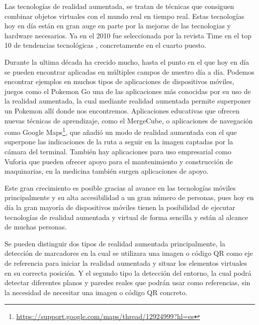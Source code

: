 
Las tecnologías de realidad aumentada, se tratan de técnicas que consiguen combinar objetos virtuales con el mundo real en tiempo real. 
Estas tecnologías hoy en día están en gran auge en parte por la mejoras de las tecnologias y hardware necesarios. Ya en el 2010 fue seleccionada por la revista Time en el top 10 de tendencias tecnológicas , concretamente en el cuarto puesto\cite{fletcher_2010}. 

Durante la ultima década ha crecido mucho, hasta el punto en el que hoy en día se pueden encontrar aplicadas en múltiples campos de nuestro día a día. Podemos encontrar ejemplos en muchos tipos de aplicaciones de dispositivos móviles, juegos como el Pokemon Go una de las aplicaciones más conocidas por su uso de la realidad aumentada, la cual mediante realidad aumentada permite superponer un Pokemon allí donde nos encontremos. Aplicaciones educativas que ofrecen nuevas técnicas de aprendizaje, como el MergeCube, o aplicaciones de navegación como Google Maps\footnote{\url{https://support.google.com/maps/thread/12924999?hl=es}}, que añadió un modo de realidad aumentada con el que superpone las indicaciones de la ruta a seguir en la imagen captadas por la cámara del terminal. También hay aplicaciones para uso empresarial como Vuforia que pueden ofrecer apoyo para el mantenimiento y construcción de maquinarias, en la medicina también surgen aplicaciones de apoyo.


Este gran crecimiento es posible gracias al avance en las tecnologías móviles principalmente y su alta accesibilidad a un gran número de personas, pues hoy en día la gran mayoría de dispositivos móviles tienen la posibilidad de ejecutar tecnologías de realidad aumentada y virtual de forma sencilla y están al alcance de muchas personas.

Se pueden distinguir dos tipos de realidad aumentada principalmente, la detección de marcadores en la cual se utilizara una imagen o código QR como eje de referencia para iniciar la realidad aumentada y situar los elementos virtuales en su correcta posición. 
Y el segundo tipo la detección del entorno, la cual podrá detectar diferentes planos y paredes reales que podrán usar como referencias, sin la necesidad de necesitar una imagen o código QR concreto.



